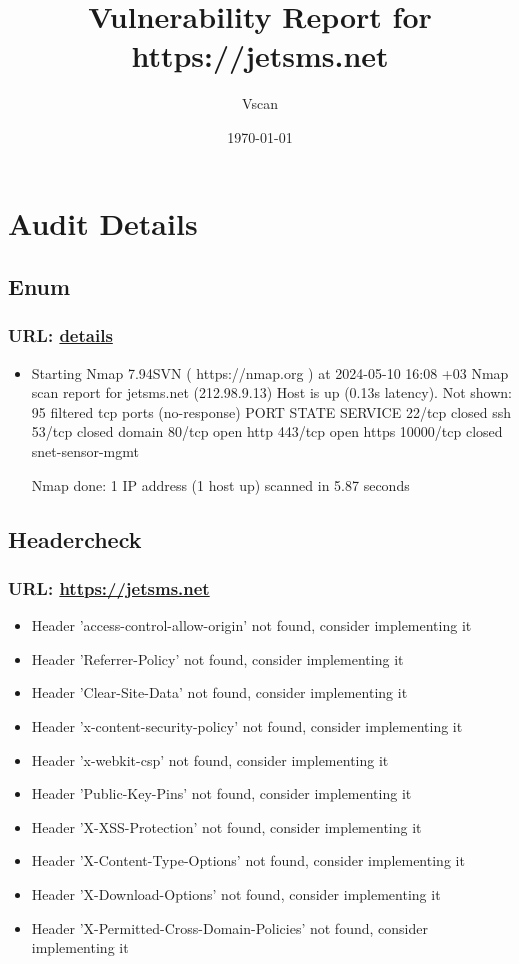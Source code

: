 \documentclass{article}
\begin{document}
\title{Vulnerability Report for https://jetsms.net}
\author{Vscan}
\date{\today}
\maketitle

\section{Audit Details}

\subsection{Enum}

\subsubsection{URL: \url{details}}
\begin{itemize}
\item Starting Nmap 7.94SVN ( https://nmap.org ) at 2024-05-10 16:08 +03
Nmap scan report for jetsms.net (212.98.9.13)
Host is up (0.13s latency).
Not shown: 95 filtered tcp ports (no-response)
PORT      STATE  SERVICE
22/tcp    closed ssh
53/tcp    closed domain
80/tcp    open   http
443/tcp   open   https
10000/tcp closed snet-sensor-mgmt

Nmap done: 1 IP address (1 host up) scanned in 5.87 seconds

\end{itemize}

\subsection{Headercheck}

\subsubsection{URL: \url{https://jetsms.net}}
\begin{itemize}
\item Header 'access-control-allow-origin' not found, consider implementing it
\item Header 'Referrer-Policy' not found, consider implementing it
\item Header 'Clear-Site-Data' not found, consider implementing it
\item Header 'x-content-security-policy' not found, consider implementing it
\item Header 'x-webkit-csp' not found, consider implementing it
\item Header 'Public-Key-Pins' not found, consider implementing it
\item Header 'X-XSS-Protection' not found, consider implementing it
\item Header 'X-Content-Type-Options' not found, consider implementing it
\item Header 'X-Download-Options' not found, consider implementing it
\item Header 'X-Permitted-Cross-Domain-Policies' not found, consider implementing it
\end{itemize}
\end{document}
